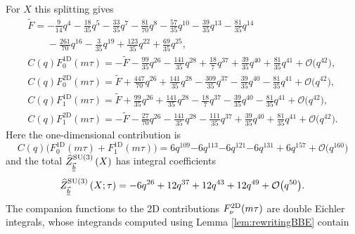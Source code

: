 \documentclass[10pt,a4paper]{amsart}
\newcommand{\Zhlong}[3]{\ensuremath{\widehat{Z}^{#1}_{#2}\left(#3;\tau\right)}}
\newcommand{\Zhshort}[3]{\ensuremath{\widehat{Z}^{#1}_{#2}\left(#3\right)}}
\theoremstyle{definition}
\numberwithin{equation}{section}
\begin{document}
For $X$ this splitting gives
\begin{gather*}%
\tilde{F}= -\frac{9}{14} q^{4} -\frac{18}{35} q^{5} -\frac{33}{35} q^{7} -\frac{81}{70} q^{8} -\frac{57}{35} q^{10} -\frac{39}{35} q^{13} -\frac{81}{35} q^{14} \\
\phantom{\tilde{F}= }{}-\frac{261}{70} q^{16} -\frac{3}{35} q^{19} + \frac{123}{35} q^{22} + \frac{69}{35} q^{25}, \\
C(q)F_{0}^{\text{1D}} (m\tau ) = -\tilde{F}-\frac{99}{35} q^{26} - \frac{141}{35} q^{28} +\frac{18}{7} q^{37} +\frac{39}{35} q^{40} +\frac{81}{35} q^{41} + \mathcal{O}\bigl(q^{42} \bigr),\\
C(q)F_{0}^{\text{2D}} (m\tau ) = \tilde{F}+\frac{447}{70} q^{26} +\frac{141}{35} q^{28} - \frac{309}{35} q^{37} - \frac{39}{35} q^{40} - \frac{81}{35} q^{41} + \mathcal{O} \bigl(q^{42} \bigr),\\
C(q)F_{1}^{\text{1D}} (m\tau )= \tilde{F}+\frac{99}{35} q^{26} +\frac{141}{35} q^{28} - \frac{18}{7} q^{37} - \frac{39}{35} q^{40} - \frac{81}{35} q^{41} + \mathcal{O} \bigl(q^{42} \bigr),\\
C(q)F_{1}^{\text{2D}} (m\tau ) = -\tilde{F}-\frac{27}{70} q^{26} - \frac{141}{35} q^{28} - \frac{111}{35} q^{37} +\frac{39}{35} q^{40} +\frac{81}{35} q^{41} + \mathcal{O} \bigl(q^{42} \bigr) .
\end{gather*}
Here the one-dimensional contribution is
\[
 C(q) \bigl(F_{0}^{\text{1D}} (m\tau ) + F_{1}^{\text{1D}} (m\tau ) \bigr)=6 q^{109} {-6} q^{113} {-6} q^{121} {-6} q^{131} + 6 q^{157} + \mathcal{O} \bigl(q^{160} \bigr)
\]
and the total $\Zhshort{{\rm SU}(3)}{\vec{\underline{b}}}{X}$ has integral coefficients
\[
\Zhlong{{\rm SU}(3)}{\vec{\underline{b}}}{X} ={-6} q^{26} + 12 q^{37} + 12 q^{43} + 12 q^{49} + \mathcal{O}\bigl(q^{50}\bigr).
\]
The companion functions to the 2D contributions $F_{\nu}^{2\rm D}(m\tau)$ are double Eichler integrals, whose integrands computed using Lemma \ref{lem:rewritingBBE} contain
\end{document}
